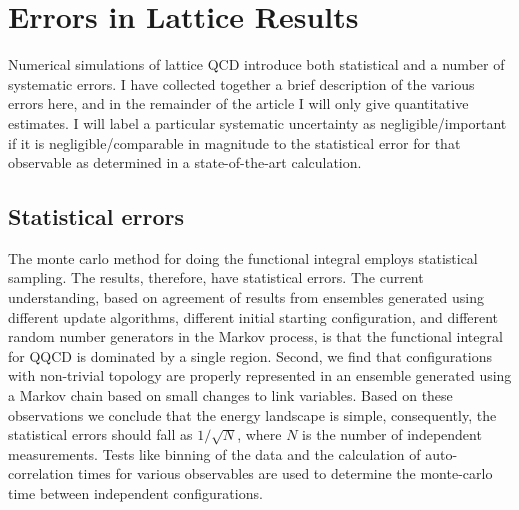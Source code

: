 
\chapter{Errors in Lattice Results}

Numerical simulations of lattice QCD introduce both statistical and a number of systematic errors. I have collected together a brief description of the various errors here, and in the remainder of the article I will only give quantitative estimates. I will label a particular systematic uncertainty as negligible/important if it is negligible/comparable in magnitude to the statistical error for that observable as determined in a state-of-the-art calculation.

\section{Statistical errors}

The monte carlo method for doing the functional integral employs statistical sampling. The results, therefore, have statistical errors. The current understanding, based on agreement of results from ensembles generated using different update algorithms, different initial starting configuration, and different random number generators in the Markov process, is that the functional integral for QQCD is dominated by a single region. Second, we find that configurations with non-trivial topology are properly represented in an ensemble generated using a Markov chain based on small changes to link variables. Based on these observations we conclude that the energy landscape is simple, consequently, the statistical errors should fall as $1/\sqrt{N}$, where $N$ is the number of independent measurements. Tests like binning of the data and the calculation of auto-correlation times for various observables are used to determine the monte-carlo time between independent configurations.

